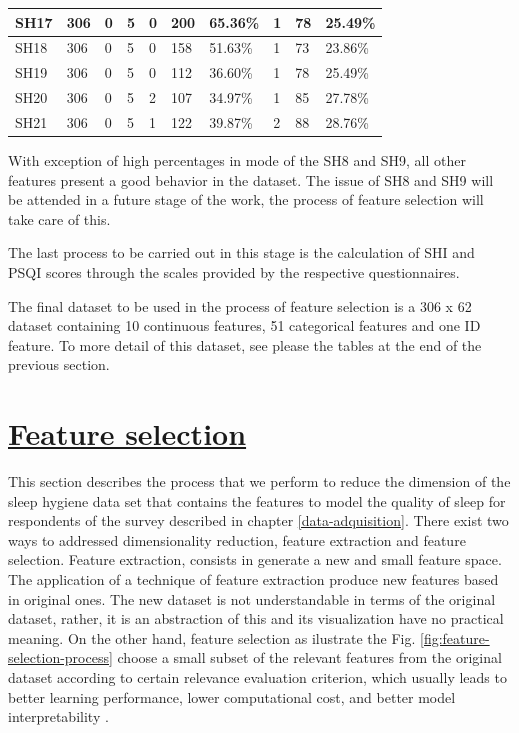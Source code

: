 \documentclass[]{book}
\begin{document}
\begin{table}[ht]
\begin{tabular}{|l|l|l|l|l|l|l|l|l|l|}
SH17    & 306   & 0    & 5    & 0    & 200      & 65.36\%  & 1     & 78        & 25.49\%   \\ \hline
SH18    & 306   & 0    & 5    & 0    & 158      & 51.63\%  & 1     & 73        & 23.86\%   \\ \hline
SH19    & 306   & 0    & 5    & 0    & 112      & 36.60\%  & 1     & 78        & 25.49\%   \\ \hline
SH20    & 306   & 0    & 5    & 2    & 107      & 34.97\%  & 1     & 85        & 27.78\%   \\ \hline
SH21    & 306   & 0    & 5    & 1    & 122      & 39.87\%  & 2     & 88        & 28.76\%   \\ \hline
\end{tabular}
\end{table}

With exception of high percentages in mode of the SH8 and SH9, all other
features present a good behavior in the dataset. The issue of SH8 and
SH9 will be attended in a future stage of the work, the process of
feature selection will take care of this.

The last process to be carried out in this stage is the calculation of
SHI and PSQI scores through the scales provided by the respective
questionnaires.

The final dataset to be used in the process of feature selection is a
306 x 62 dataset containing 10 continuous features, 51 categorical
features and one ID feature. To more detail of this dataset, see please
the tables at the end of the previous section.

\hypertarget{feature-selection}{\chapter{\texorpdfstring{\protect\hyperlink{feature-selection}{Feature
selection}}{Feature selection}}\label{feature-selection}}

This section describes the process that we perform to reduce the
dimension of the sleep hygiene data set that contains the features to
model the quality of sleep for respondents of the survey described in
chapter \ref{data-adquisition}. There exist two ways to addressed
dimensionality reduction, feature extraction and feature selection.
Feature extraction, consists in generate a new and small feature space.
The application of a technique of feature extraction produce new
features based in original ones. The new dataset is not understandable
in terms of the original dataset, rather, it is an abstraction of this
and its visualization have no practical meaning. On the other hand,
feature selection as ilustrate the Fig.
\ref{fig:feature-selection-process} choose a small subset of the
relevant features from the original dataset according to certain
relevance evaluation criterion, which usually leads to better learning
performance, lower computational cost, and better model interpretability
\citep{Tang2014}.
\end{document}
